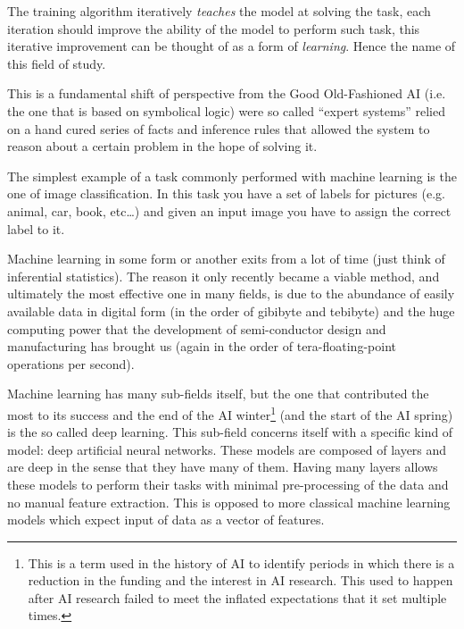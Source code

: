 \documentclass{sapthesis}
\begin{document}
The training algorithm iteratively \emph{teaches} the model at solving the task,
each iteration should improve the ability of the model to perform such task,
this iterative improvement can be thought of as a form of \emph{learning}. Hence
the name of this field of study.

This is a fundamental shift of perspective from the Good Old-Fashioned AI
(i.e. the one that is based on symbolical logic) were so called ``expert systems''
relied on a hand cured series of facts and inference rules that allowed the
system to reason about a certain problem in the hope of solving it.

The simplest example of a task commonly performed with machine learning is the
one of image classification. In this task you have a set of labels for pictures
(e.g. animal, car, book, etc\dots) and given an input image you have to assign
the correct label to it.

Machine learning in some form or another exits from a lot of time (just think of
inferential statistics). The reason it only recently became a viable method, and
ultimately the most effective one in many fields, is due to the abundance of
easily available data in digital form (in the order of gibibyte and tebibyte)
and the huge computing power that the development of semi-conductor design and
manufacturing has brought us (again in the order of tera-floating-point
operations per second).

Machine learning has many sub-fields itself, but the one that contributed the
most to its success and the end of the AI winter\footnote{This is a term used in
the history of AI to identify periods in which there is a reduction in the
funding and the interest in AI research. This used to happen after AI research
failed to meet the inflated expectations that it set multiple times.} (and the
start of the AI spring) is the so called deep learning. This sub-field concerns
itself with a specific kind of model: deep artificial neural networks. These
models are composed of layers and are deep in the sense that they have many of
them. Having many layers allows these models to perform their tasks with minimal
pre-processing of the data and no manual feature extraction. This is opposed to
more classical machine learning models which expect input of data as a vector of
features.

\end{document}
